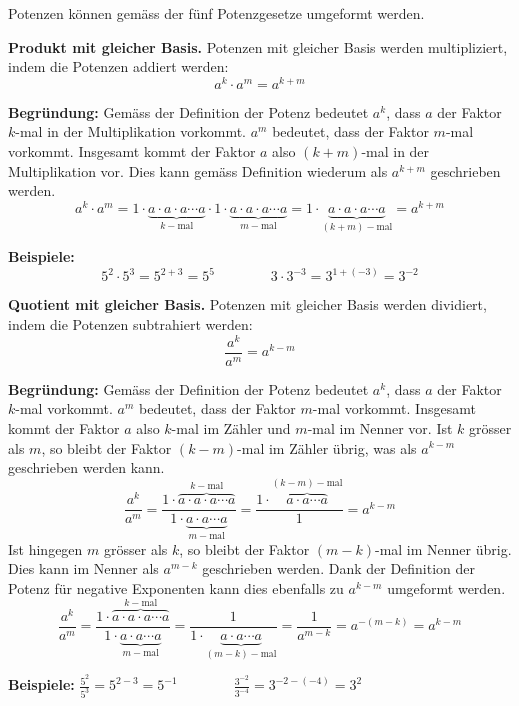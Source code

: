 Potenzen können gemäss der fünf Potenzgesetze umgeformt werden.
\begin{theorem}
  \textbf{Produkt mit gleicher Basis.} Potenzen mit gleicher Basis werden multipliziert, indem die Potenzen addiert werden:
  \[
    a^{k} \cdot a^{m} = a^{k+m}
  \]
\end{theorem}
\textbf{Begründung:} Gemäss der Definition der Potenz bedeutet $a^{k}$, dass $a$ der Faktor $k$-mal in der Multiplikation vorkommt. $a^{m}$ bedeutet, dass der Faktor $m$-mal vorkommt. Insgesamt kommt der Faktor $a$ also $(k+m)$-mal in der Multiplikation vor. Dies kann gemäss Definition wiederum als $a^{k+m}$ geschrieben werden.
\[
  a^{k}\cdot a^{m} = 1\cdot\underbrace{a\cdot a\cdot a\cdots a}_{k-\text{mal}}\cdot 1\cdot\underbrace{a\cdot a\cdot a\cdots a}_{m-\text{mal}} = 1\cdot\underbrace{a\cdot a\cdot a\cdots a}_{(k+m)-\text{mal}} = a^{k+m}
\]
\begin{example}
  \textbf{Beispiele:}
  \[
    5^{2}\cdot 5^{3} = 5^{2+3} = 5^{5} \qquad\qquad 3\cdot 3^{-3} = 3^{1+(-3)} = 3^{-2}
  \]
\end{example}
\vspace{1cm}
\begin{theorem}
  \textbf{Quotient mit gleicher Basis.} Potenzen mit gleicher Basis werden dividiert, indem die Potenzen subtrahiert werden:
  \[
    \frac{a^{k}}{a^{m}} = a^{k-m}
  \]
\end{theorem}
\textbf{Begründung:} Gemäss der Definition der Potenz bedeutet $a^{k}$, dass $a$ der Faktor $k$-mal vorkommt. $a^{m}$ bedeutet, dass der Faktor $m$-mal vorkommt. Insgesamt kommt der Faktor $a$ also $k$-mal im Zähler und $m$-mal im Nenner vor. Ist $k$ grösser als $m$, so bleibt der Faktor $(k-m)$-mal im Zähler übrig, was als $a^{k-m}$ geschrieben werden kann.
\[
  \frac{a^{k}}{a^{m}} = \frac{1\cdot\overbrace{a\cdot a\cdot a\cdots a}^{k-\text{mal}}}{1\cdot\underbrace{a\cdot a\cdots a}_{m-\text{mal}}} = \frac{1\cdot\overbrace{a\cdot a\cdots a}^{(k-m)-\text{mal}}}{1} = a^{k-m}
\]
Ist hingegen $m$ grösser als $k$, so bleibt der Faktor $(m-k)$-mal im Nenner übrig. Dies kann im Nenner als $a^{m-k}$ geschrieben werden. Dank der Definition der Potenz für negative Exponenten kann dies ebenfalls zu $a^{k-m}$ umgeformt werden.
\[
  \frac{a^{k}}{a^{m}} = \frac{1\cdot\overbrace{a\cdot a\cdot a\cdots a}^{k-\text{mal}}}{1\cdot\underbrace{a\cdot a\cdots a}_{m-\text{mal}}} = \frac{1}{1\cdot\underbrace{a\cdot a\cdots a}_{(m-k)-\text{mal}}} = \frac{1}{a^{m-k}} = a^{-(m-k)} = a^{k-m}
\]
\begin{example}
  \textbf{Beispiele:} $\displaystyle \frac{5^{2}}{5^{3}} = 5^{2-3} = 5^{-1} \qquad\qquad \frac{3^{-2}}{3^{-4}} = 3^{-2-(-4)} = 3^{2}$
\end{example}

